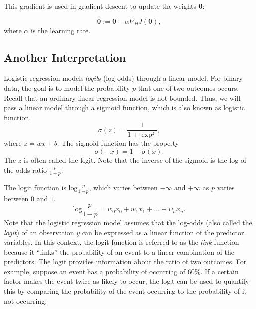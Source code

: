 This gradient is used in gradient descent to update the weights $\boldsymbol{\theta}$:

\[
\boldsymbol{\theta} := \boldsymbol{\theta} - \alpha \nabla_{\boldsymbol{\theta}} J(\boldsymbol{\theta}),
\]
where $\alpha$ is the learning rate.

\subsection{Another Interpretation}

Logistic regression models \textit{logit}s (log odds) through a linear model. For binary data, the goal is to model the probability $p$ that one of two outcomes occurs. Recall that an ordinary linear regression model is not bounded. Thus, we will pass a linear model through a sigmoid function, which is also known as logistic function. 
$$\sigma(z) = \frac{1}{1+\exp^{z}},$$
where $z=wx+b.$
The sigmoid function has the property
$$\sigma(-x) = 1-\sigma(x).$$
The $z$ is often called the logit. Note that the inverse of the sigmoid is the log of the odds ratio $\frac{p}{1-p}.$

The logit function is $\textrm{log}\frac{p}{1-p}$, which varies between $-\infty$ and $+\infty$ as $p$ varies between $0$ and $1$.
$$\textrm{log}\frac{p}{1-p} = w_0x_0 +  w_1x_1 + \dots + w_nx_n.$$
Note that the logistic regression model assumes that the log-odds (also called the \textit{logit}) of an observation $y$ can be expressed as a linear function of the predictor variables. In this context, the logit function is referred to as the \textit{link} function because it ``links'' the probability of an event to a linear combination of the predictors. The logit provides information about the ratio of two outcomes. For example, suppose an event has a probability of occurring of 60\%. If a certain factor makes the event twice as likely to occur, the logit can be used to quantify this by comparing the probability of the event occurring to the probability of it not occurring.

